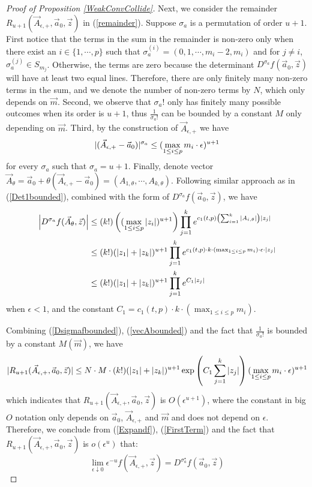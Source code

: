 \begin{proof}[Proof of Proposition \ref{WeakConvCollide}]
Next, we consider the remainder $R_{u+1}(\vec{A}_{\epsilon,+},\vec{a}_{0},\vec{z})$ in (\ref{remainder}). Suppose $\sigma_{a}$ is a permutation of order $u+1$. First notice that the terms in the sum in the remainder is non-zero only when there exist an $i\in\{1,\cdots,p\}$ such that $\sigma_{a}^{(i)}=(0,1,\cdots,m_i-2,m_i)$ and for $j\neq i$, $\sigma_{a}^{(j)}\in S_{m_j}$. Otherwise, the terms are zero because the determinant $D^{\sigma_{a}}f(\vec{a}_0,\vec{z})$ will have at least two equal lines. Therefore, there are only finitely many non-zero terms in the sum, and we denote the number of non-zero terms by $N$, which only depends on $\vec{m}$. Second, we observe that $\sigma_{a}!$ only has finitely many possible outcomes when its order is $u+1$, thus $\frac{1}{\sigma_{a}!}$ can be bounded by a constant $M$ only depending on $\vec{m}$. Third, by the construction of $\vec{A}_{\epsilon,+}$ we have
\begin{equation}{\label{vecAbounded}}
	|(\vec{A}_{\epsilon,+}-\vec{a}_{0})|^{\sigma_{a}}\leq (\max_{1\leq i\leq p}m_{i}\cdot \epsilon)^{u+1}
\end{equation} 
for every $\sigma_{a}$ such that $\sigma_a=u+1$. Finally, denote vector $\vec{A}_\theta=\vec{a}_{0}+\theta(\vec{A}_{\epsilon,+}-\vec{a}_0)=(A_{1,\theta},\cdots,A_{k,\theta})$. Following similar approach as in (\ref{Det1bounded}), combined with the form of $D^{\sigma_a}f(\vec{a}_0,\vec{z})$, we have
\begin{equation}{\label{Dsigmafbounded}}
	\begin{split}
		\left|D^{\sigma_a}f(\vec{A}_{\theta},\vec{z})\right|&\leq (k!)\left((\max_{1\leq i\leq p}|z_i|)^{u+1}\right)\prod_{j=1}^{k}e^{c_1(t,p)\left(\sum_{i=1}^{k}|A_{i,\theta}|\right)|z_j|}\\
		&\leq (k!)(|z_1|+|z_k|)^{u+1}\prod_{j=1}^{k}e^{c_{1}(t,p)\cdot k\cdot (\max_{1\leq i\leq p}m_i)\cdot\epsilon\cdot|z_j|}\\
		&\leq (k!)(|z_1|+|z_k|)^{u+1}\prod_{j=1}^{k}e^{C_1|z_j|}
	\end{split}
\end{equation}
when $\epsilon<1$, and the constant $C_1=c_1(t,p)\cdot k\cdot(\max_{1\leq i\leq p}m_i)$.

Combining (\ref{Dsigmafbounded}), (\ref{vecAbounded}) and the fact that $\frac{1}{\sigma_a!}$ is bounded by a constant $M(\vec{m})$, we have
\begin{equation}{\label{RemainderBounded}}
	|R_{u+1}(\vec{A}_{\epsilon,+},\vec{a}_{0},\vec{z})|\leq N\cdot M \cdot (k!)(|z_1|+|z_k|)^{u+1}\exp\left(C_1\sum_{j=1}^{k}|z_j|\right)(\max_{1\leq i\leq p}m_{i}\cdot \epsilon)^{u+1}
\end{equation}
which indicates that $R_{u+1}(\vec{A}_{\epsilon,+},\vec{a}_{0},\vec{z})$ is $O(\epsilon^{u+1})$, where the constant in big $O$ notation only depends on $\vec{a}_{0}$, $\vec{A}_{\epsilon,+}$ and $\vec{m}$ and does not depend on $\epsilon$. Therefore, we conclude from (\ref{Expandf}), (\ref{FirstTerm}) and the fact that $R_{u+1}(\vec{A}_{\epsilon,+},\vec{a}_{0},\vec{z})$ is $o(\epsilon^{u})$ that:
$$\lim_{\epsilon\downarrow 0}\epsilon^{-u}f(\vec{A}_{\epsilon,+},\vec{z})=D^{\sigma_{a}^{\star}}f(\vec{a}_{0},\vec{z})$$


\end{proof}

